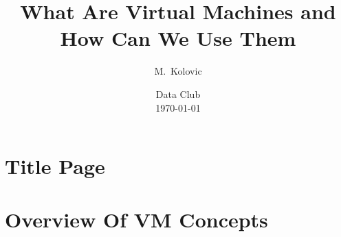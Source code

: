 \documentclass{beamer}
\title[Virtual Machines]
{
    What Are Virtual Machines and How Can We Use Them
}
\author[Kolovic]
{
    M.~Kolovic
}
\institute[UWO]
{
    Robarts Research Institute \\
    University of Western Ontario
}
\date[Summer 2016]
{
    Data Club \\
    \today
}
\begin{document}
\section[Title]{Title Page}

\frame{\titlepage}

\frame{\tableofcontents}

\section[Introduction]{Overview Of VM Concepts}


\end{document}

